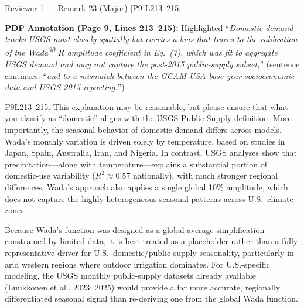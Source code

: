 \documentclass[11pt,letterpaper]{article}
\newcommand{\hlquote}[1]{``\textit{#1}''}
\begin{document}
\begin{commentbox}[label={r1:rem23}]{Reviewer 1 --- Remark 23 (Major) [P9 L213--215]}
\begin{annotcontext}
\textbf{PDF Annotation (Page 9, Lines 213--215):} Highlighted \hlquote{Domestic demand tracks USGS most closely spatially but carries a bias that traces to the calibration of the Wada\textsuperscript{30} $R$ amplitude coefficient in Eq.~(7), which was fit to aggregate USGS demand and may not capture the post-2015 public-supply subset,} (sentence continues: \hlquote{and to a mismatch between the GCAM-USA base-year socioeconomic data and USGS 2015 reporting.})
\end{annotcontext}
P9L213--215. This explanation may be reasonable, but please ensure that what you classify as ``domestic'' aligns with the USGS Public Supply definition. More importantly, the seasonal behavior of domestic demand differs across models. Wada's monthly variation is driven solely by temperature, based on studies in Japan, Spain, Australia, Iran, and Nigeria. In contrast, USGS analyses show that precipitation---along with temperature---explains a substantial portion of domestic-use variability ($R^2 \approx 0.57$ nationally), with much stronger regional differences. Wada's approach also applies a single global 10\% amplitude, which does not capture the highly heterogeneous seasonal patterns across U.S.\ climate zones.

Because Wada's function was designed as a global-average simplification constrained by limited data, it is best treated as a placeholder rather than a fully representative driver for U.S.\ domestic/public-supply seasonality, particularly in arid western regions where outdoor irrigation dominates. For U.S.-specific modeling, the USGS monthly public-supply datasets already available (Luukkonen et al., 2023; 2025) would provide a far more accurate, regionally differentiated seasonal signal than re-deriving one from the global Wada function.


\end{commentbox}
\end{document}

